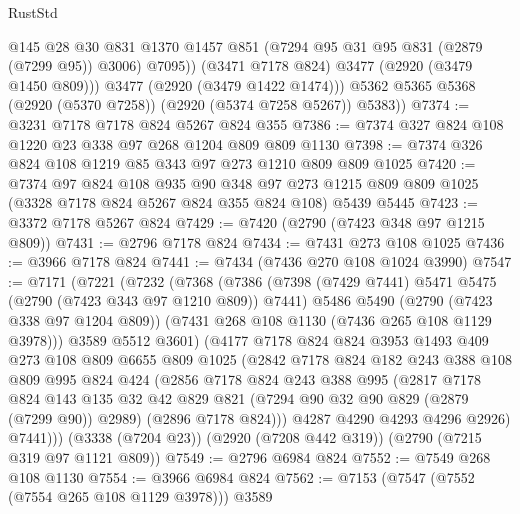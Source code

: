 \begin{lexlean}{RustStd}
\begin{coremodule}
                @145
                @28
                @30
                @831
                @1370
                @1457
                @851
                (@7294 @95 @31 @95 @831 (@2879 (@7299 @95)) @3006)
                @7095))
            (@3471 @7178 @824)
            @3477
            (@2920 (@3479 @1450 @809)))
          @3477
          (@2920 (@3479 @1422 @1474)))
        @5362
        @5365
        @5368
        (@2920 (@5370 @7258))
        (@2920 (@5374 @7258 @5267))
        @5383))
@7374 := @3231 @7178 @7178 @824 @5267 @824 @355
@7386 := @7374 @327 @824 @108 @1220 @23 @338 @97 @268 @1204 @809 @809 @1130
@7398 := @7374 @326 @824 @108 @1219 @85 @343 @97 @273 @1210 @809 @809 @1025
@7420 := @7374
    @97
    @824
    @108
    @935
    @90
    @348
    @97
    @273
    @1215
    @809
    @809
    @1025
    (@3328 @7178 @824 @5267 @824 @355 @824 @108)
    @5439
    @5445
@7423 := @3372 @7178 @5267 @824
@7429 := @7420 (@2790 (@7423 @348 @97 @1215 @809))
@7431 := @2796 @7178 @824
@7434 := @7431 @273 @108 @1025
@7436 := @3966 @7178 @824
@7441 := @7434 (@7436 @270 @108 @1024 @3990)
@7547 := @7171
    (@7221
      (@7232
        (@7368
          (@7386
            (@7398 (@7429 @7441) @5471 @5475 (@2790 (@7423 @343 @97 @1210 @809)) @7441)
            @5486
            @5490
            (@2790 (@7423 @338 @97 @1204 @809))
            (@7431 @268 @108 @1130 (@7436 @265 @108 @1129 @3978)))
          @3589
          @5512
          @3601)
        (@4177
          @7178
          @824
          @824
          @3953
          @1493
          @409
          @273
          @108
          @809
          @6655
          @809
          @1025
          (@2842
            @7178
            @824
            @182
            @243
            @388
            @108
            @809
            @995
            @824
            @424
            (@2856
              @7178
              @824
              @243
              @388
              @995
              (@2817
                @7178
                @824
                @143
                @135
                @32
                @42
                @829
                @821
                (@7294 @90 @32 @90 @829 (@2879 (@7299 @90)) @2989)
                (@2896 @7178 @824)))
            @4287
            @4290
            @4293
            @4296
            @2926)
          @7441)))
    (@3338 (@7204 @23))
    (@2920 (@7208 @442 @319))
    (@2790 (@7215 @319 @97 @1121 @809))
@7549 := @2796 @6984 @824
@7552 := @7549 @268 @108 @1130
@7554 := @3966 @6984 @824
@7562 := @7153 (@7547 (@7552 (@7554 @265 @108 @1129 @3978))) @3589

\end{coremodule}
\end{lexlean}
